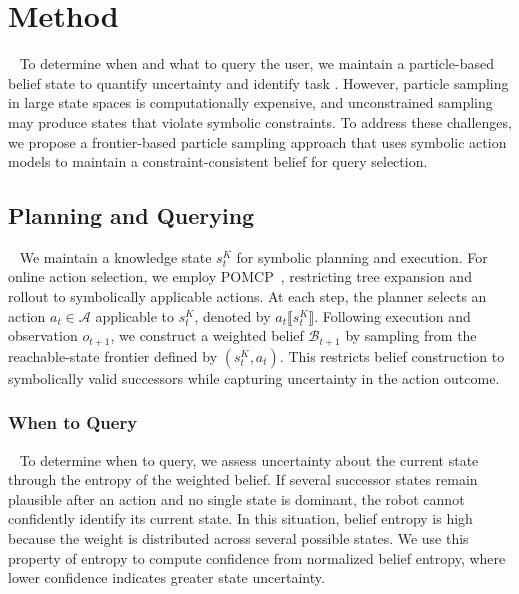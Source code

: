 
\section{Method}~\label{method:method}
To determine when and what to query the user, we maintain a particle-based belief state to quantify uncertainty and identify  task . However, particle sampling in large state spaces is computationally expensive, and unconstrained sampling may produce states that violate symbolic constraints. To address these challenges, we propose a frontier-based particle sampling approach that uses symbolic action models to maintain a constraint-consistent belief for query selection.

\subsection{Planning and Querying}~\label{method:overview}\label{method:planning}\label{method:PM}
We maintain a knowledge state $s_t^{K}$ for symbolic planning and execution. For online action selection, we employ POMCP~\cite{silver2010monte}, restricting tree expansion and rollout to symbolically applicable actions. At each step, the planner selects an action $a_t\in\mathcal{A}$ applicable to $s_t^{K}$, denoted by $a_t\llbracket s_t^{K}\rrbracket$. Following execution and observation $o_{t+1}$, we construct a weighted belief $\mathcal{B}_{t+1}$ by sampling from the reachable-state frontier defined by $(s_t^{K},a_t)$. This restricts belief construction to symbolically valid successors while capturing uncertainty in the action outcome. 

\subsubsection{When to Query}~\label{method:when}\label{method:belief_rep}
To determine when to query, we assess uncertainty about the current state through the entropy of the weighted belief. If several successor states remain plausible after an action and no single state is dominant, the robot cannot confidently identify its current state. In this situation, belief entropy is high because the weight is distributed across several possible states. We use this property of entropy to compute confidence from normalized belief entropy, where lower confidence indicates greater state uncertainty.

